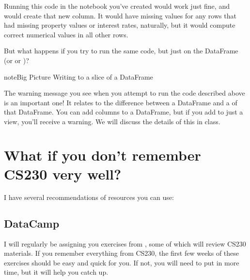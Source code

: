 \documentclass[letterpaper,10pt,english]{sphinxmanual}
\begin{document}
\begin{sphinxVerbatim}[commandchars=\\\{\}]
\PYG{p}{[}\PYG{p}{]}  \PYG{p}{[}\PYG{p}{]}  \PYG{p}{[}\PYG{p}{]}  
\end{sphinxVerbatim}

Running this code in the notebook you’ve created would work just fine, and would create that new column.  It would have missing values for any rows that had missing property values or interest rates, naturally, but it would compute correct numerical values in all other rows.

But what happens if you try to run the same code, but just on the  DataFrame (or  or )?

\begin{sphinxadmonition}{note}{Big Picture \sphinxhyphen{} Writing to a slice of a DataFrame}

The warning message you see when you attempt to run the code described above is an important one!  It relates to the difference between a DataFrame and a  of that DataFrame.  You can add columns to a DataFrame, but if you add to just a view, you’ll receive a warning.  We will discuss the details of this in class.
\end{sphinxadmonition}


\section{What if you don’t remember CS230 very well?}
\label{\detokenize{chapter-4-review-of-python-and-pandas:what-if-you-don-t-remember-cs230-very-well}}
I have several recommendations of resources you can use:


\subsection{DataCamp}
\label{\detokenize{chapter-4-review-of-python-and-pandas:datacamp}}
I will regularly be assigning you exercises from , some of which will review CS230 materials.  If you remember everything from CS230, the first few weeks of these exercises should be easy and quick for you.  If not, you will need to put in more time, but it will help you catch up.
\end{document}
